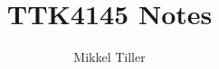 \documentclass[11pt, a4paper, USenglish]{article}
\begin{document}
\title{TTK4145 Notes}
\author{Mikkel Tiller}
\date{}
\maketitle

\end{document}
